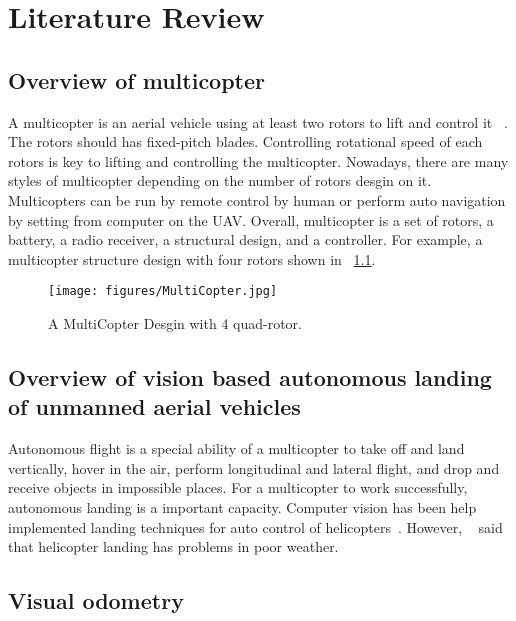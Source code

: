 \documentclass[12pt, a4paper]{aitthesis}
\begin{document}
\FloatBarrier

%
\chapter{Literature Review} \label{literature}

\section{Overview of multicopter}
A multicopter is an aerial vehicle using at least two rotors to lift and control it ~. The rotors should has fixed-pitch blades. Controlling rotational speed of each rotors is key to lifting and controlling the multicopter. Nowadays, there are many styles of multicopter depending on the number of rotors desgin on it. Multicopters can be run by remote control by human or perform auto navigation by setting from computer on the UAV. Overall, multicopter is a set of rotors, a battery, a radio receiver, a structural design, and a controller. For example, a multicopter structure design with four rotors shown in \figurename~\ref{fig:ardone}. 

\begin{figure}[t]
\begin{center}
	\texttt{[image: figures/MultiCopter.jpg]}
	\caption[MultiCopter Desgin]{A MultiCopter Desgin with 4 quad-rotor.} \label{fig:ardone}
\end{center}
\end{figure}

\FloatBarrier

\section{Overview of vision based autonomous landing of  unmanned aerial vehicles}
Autonomous flight is a special ability of a multicopter to take off and land vertically, hover in the air, perform  longitudinal and lateral flight, and drop and receive objects in impossible places. For a multicopter to work successfully, autonomous landing is a important capacity. Computer vision has been help implemented landing techniques for auto control of helicopters~. However, ~ said that helicopter landing has problems in poor weather.
\section{Visual odometry}
\end{document}
